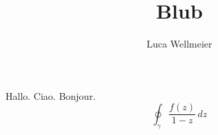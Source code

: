 \documentclass[12pt]{scrreprt}
\begin{document}
\author{Luca Wellmeier}
\title{Blub}
\maketitle
\tableofcontents
Hallo.
Ciao.
Bonjour.
\[ \oint_\gamma \frac{f(z)}{1-z} \, dz \]
\end{document}
